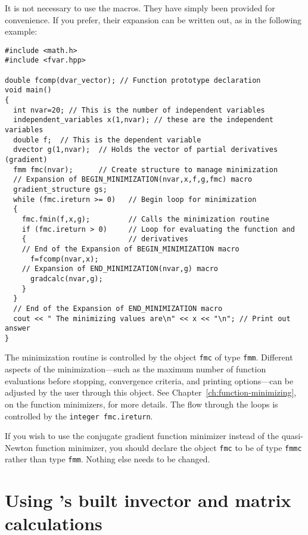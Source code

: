 \documentclass{admbmanual}
\begin{document}
It is not necessary to use the macros. They have simply
been provided for convenience. If you prefer, their expansion
can be written out, as in the following example:
\begin{lstlisting}
#include <math.h>
#include <fvar.hpp>

double fcomp(dvar_vector); // Function prototype declaration
void main()
{
  int nvar=20; // This is the number of independent variables
  independent_variables x(1,nvar); // these are the independent variables
  double f;  // This is the dependent variable
  dvector g(1,nvar);  // Holds the vector of partial derivatives (gradient) 
  fmm fmc(nvar);      // Create structure to manage minimization
  // Expansion of BEGIN_MINIMIZATION(nvar,x,f,g,fmc) macro 
  gradient_structure gs;
  while (fmc.ireturn >= 0)   // Begin loop for minimization
  {
    fmc.fmin(f,x,g);         // Calls the minimization routine
    if (fmc.ireturn > 0)     // Loop for evaluating the function and
    {                        // derivatives
    // End of the Expansion of BEGIN_MINIMIZATION macro
      f=fcomp(nvar,x);
    // Expansion of END_MINIMIZATION(nvar,g) macro
      gradcalc(nvar,g); 
    }
  }
  // End of the Expansion of END_MINIMIZATION macro
  cout << " The minimizing values are\n" << x << "\n"; // Print out answer
}
\end{lstlisting}

The minimization routine is controlled by the object \texttt{fmc} 
of type \texttt{fmm}. Different aspects of the minimization---such as
the maximum number of function evaluations before stopping, convergence
criteria, and printing options---can be adjusted by the user
through this object. See Chapter~\ref{ch:function-minimizing}, on the function minimizers, for
more details. 
The flow through the loops is controlled by the \texttt{integer fmc.ireturn}.

If you wish to use the conjugate gradient function minimizer instead 
of the quasi-Newton function minimizer, you should declare the 
object \texttt{fmc} to be of type \texttt{fmmc} rather than type \texttt{fmm}.
Nothing else needs to be changed.



\section{Using \scAD's built in\br vector and matrix calculations}
\end{document}
